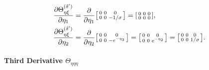 \documentclass{article}
\begin{document}
\begin{align}
  \frac{\partial \Theta_{\eta\xi}^{(\delta')}}{\partial \eta_1} & = \frac{\partial}{\partial \eta_1} \begin{bsmallmatrix} 0 & 0 & 0 \\ 0 & 0 & -1/\sigma \end{bsmallmatrix} = \begin{bsmallmatrix} 0 & 0 & 0 \\ 0 & 0 & 0 \end{bsmallmatrix},                                   \\
  \frac{\partial \Theta_{\eta\xi}^{(\delta')}}{\partial \eta_2} & = \frac{\partial}{\partial \eta_2} \begin{bsmallmatrix} 0 & 0 & 0 \\ 0 & 0 & -e^{-\eta_2} \end{bsmallmatrix} = \begin{bsmallmatrix} 0 & 0 & 0 \\ 0 & 0 & e^{-\eta_2} \end{bsmallmatrix} = \begin{bsmallmatrix} 0 & 0 & 0 \\ 0 & 0 & 1/\sigma \end{bsmallmatrix}.
\end{align}

\paragraph{Third Derivative $\Theta_{\eta\eta\eta}$}
\end{document}
